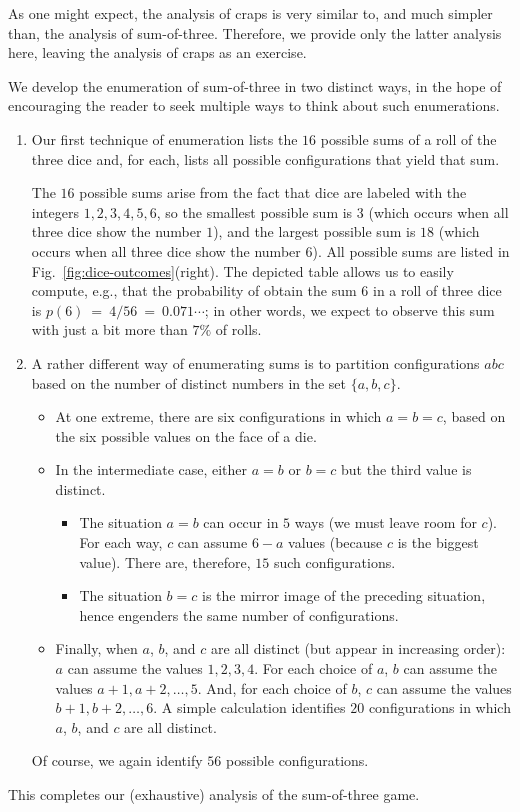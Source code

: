 \medskip

As one might expect, the analysis of craps is very similar to, and much simpler than, the analysis of sum-of-three.  Therefore, we provide only the latter analysis here, leaving the analysis of craps as an exercise.

\medskip

We develop the enumeration of sum-of-three in two distinct ways, in the hope of encouraging the reader to seek multiple ways to think about such enumerations.
\begin{enumerate}
\item 
Our first technique of enumeration lists the $16$ possible sums of a roll of the three  dice and, for each, lists all possible configurations that yield that sum.

\smallskip

The $16$ possible sums arise from the fact that dice are labeled with the integers $1, 2, 3, 4, 5, 6$, so the smallest possible sum is $3$ (which occurs when all three dice show the number $1$), and the largest possible sum is $18$ (which occurs when all three dice show the number $6$).  All possible sums are listed in Fig.~\ref{fig:dice-outcomes}(right).  The depicted table allows us to easily compute, e.g., that the probability of obtain the sum $6$ in a roll of three dice is $p(6) \ = \ 4/56 \ = \ 0.071\cdots$; in other words, we expect to observe this sum with just a bit more than $7\%$ of rolls.

\medskip\item 
A rather different way of enumerating sums is to partition configurations $abc$ based on the number of distinct numbers in the set $\{ a, b, c\}$.
\begin{itemize}
\item
At one extreme, there are six configurations in which $a = b = c$, based on the six possible values on the face of a die.
\medskip\item
In the intermediate case, either $a=b$ or $b=c$ but the third value is distinct.
  \begin{itemize}
  \item
The situation $a=b$ can occur in $5$ ways (we must leave room for $c$).  For each way, $c$ can assume $6-a$ values (because $c$ is the biggest value).  There are, therefore, $15$ such configurations.
  \medskip\item
The situation $b=c$ is the mirror image of the preceding situation, hence engenders the same number of configurations.
  \end{itemize}

\medskip\item
Finally, when $a$, $b$, and $c$ are all distinct (but appear in increasing order): $a$ can assume the values $1, 2, 3, 4$.  For each choice of $a$, $b$ can assume the values $a+1, a+2, \ldots, 5$.  And, for each choice of $b$, $c$ can assume the values $b+1, b+2, \ldots, 6$.  A simple calculation identifies $20$ configurations in which $a$, $b$, and $c$ are all distinct.
\end{itemize}
Of course, we again identify $56$ possible configurations.
\end{enumerate}
This completes our (exhaustive) analysis of the sum-of-three game.


